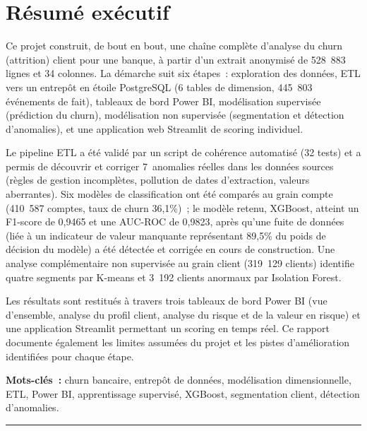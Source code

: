 \documentclass[11pt,a4paper]{report}
\begin{document}
\chapter*{R\'esum\'e ex\'ecutif}

Ce projet construit, de bout en bout, une cha\^ine compl\`ete d'analyse du churn
(attrition) client pour une banque, \`a partir d'un extrait anonymis\'e de
528~883 lignes et 34 colonnes. La d\'emarche suit six \'etapes~: exploration des
donn\'ees, ETL vers un entrep\^ot en \'etoile PostgreSQL (6 tables de dimension,
445~803 \'ev\'enements de fait), tableaux de bord Power BI, mod\'elisation
supervis\'ee (pr\'ediction du churn), mod\'elisation non supervis\'ee (segmentation
et d\'etection d'anomalies), et une application web Streamlit de scoring
individuel.

Le pipeline ETL a \'et\'e valid\'e par un script de coh\'erence automatis\'e (32
tests) et a permis de d\'ecouvrir et corriger 7~anomalies r\'eelles dans les
donn\'ees sources (r\`egles de gestion incompl\`etes, pollution de dates
d'extraction, valeurs aberrantes). Six mod\`eles de classification ont \'et\'e
compar\'es au grain compte (410~587 comptes, taux de churn 36,1\%)~; le mod\`ele
retenu, XGBoost, atteint un F1-score de 0,9465 et une AUC-ROC de 0,9823, apr\`es
qu'une fuite de donn\'ees (li\'ee \`a un indicateur de valeur manquante
repr\'esentant 89,5\% du poids de d\'ecision du mod\`ele) a \'et\'e d\'etect\'ee et
corrig\'ee en cours de construction. Une analyse compl\'ementaire non supervis\'ee
au grain client (319~129 clients) identifie quatre segments par K-means et
3~192 clients anormaux par Isolation Forest.

Les r\'esultats sont restitu\'es \`a travers trois tableaux de bord Power BI
(vue d'ensemble, analyse du profil client, analyse du risque et de la valeur
en risque) et une application Streamlit permettant un scoring en temps r\'eel.
Ce rapport documente \'egalement les limites assum\'ees du projet et les pistes
d'am\'elioration identifi\'ees pour chaque \'etape.

\textbf{Mots-cl\'es~:} churn bancaire, entrep\^ot de donn\'ees, mod\'elisation
dimensionnelle, ETL, Power BI, apprentissage supervis\'e, XGBoost, segmentation
client, d\'etection d'anomalies.

\bigskip
\hrule
\bigskip
\end{document}
